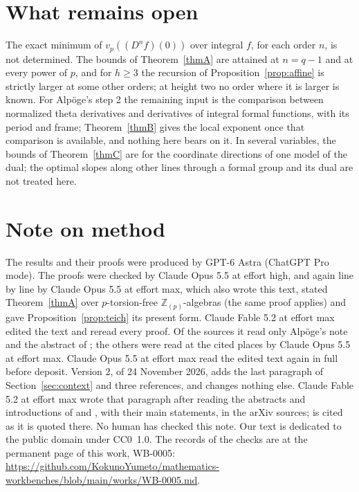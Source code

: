 \documentclass[11pt]{amsart}
\newcommand{\workbenchurl}{https://github.com/KokunoYumeto/mathematics-workbenches/blob/main/works/WB-0005.md}
\theoremstyle{definition}
\theoremstyle{remark}
\newcommand{\Z}{\mathbb Z}
\newcommand{\vp}{v_p}
\begin{document}
\section{What remains open}
The exact minimum of $\vp((D^nf)(0))$ over integral $f$, for each order $n$, is not determined. The bounds of Theorem~\ref{thmA} are attained at $n=q-1$ and at every power of $p$, and for $h\ge3$ the recursion of Proposition~\ref{prop:affine} is strictly larger at some other orders; at height two no order where it is larger is known. For Alp\"oge's step 2 the remaining input is the comparison between normalized theta derivatives and derivatives of integral formal functions, with its period and frame; Theorem~\ref{thmB} gives the local exponent once that comparison is available, and nothing here bears on it. In several variables, the bounds of Theorem~\ref{thmC} are for the coordinate directions of one model of the dual; the optimal slopes along other lines through a formal group and its dual are not treated here.

\section*{Note on method}
The results and their proofs were produced by GPT-6 Astra (ChatGPT Pro mode). The proofs were checked by Claude Opus 5.5 at effort high, and again line by line by Claude Opus 5.5 at effort max, which also wrote this text, stated Theorem~\ref{thmA} over $p$-torsion-free $\Z_{(p)}$-algebras (the same proof applies) and gave Proposition~\ref{prop:teich} its present form. Claude Fable 5.2 at effort max edited the text and reread every proof. Of the sources it read only Alp\"oge's note and the abstract of \cite{Three}; the others were read at the cited places by Claude Opus 5.5 at effort max. Claude Opus 5.5 at effort max read the edited text again in full before deposit. Version 2, of 24 November 2026, adds the last paragraph of Section~\ref{sec:context} and three references, and changes nothing else. Claude Fable 5.2 at effort max wrote that paragraph after reading the abstracts and introductions of \cite{Katagiri26a} and \cite{Katagiri26b}, with their main statements, in the arXiv sources; \cite{AB26} is cited as it is quoted there. No human has checked this note. Our text is dedicated to the public domain under CC0~1.0. The records of the checks are at the permanent page of this work, WB-0005: \expandafter\url\expandafter{\workbenchurl}.
\end{document}
